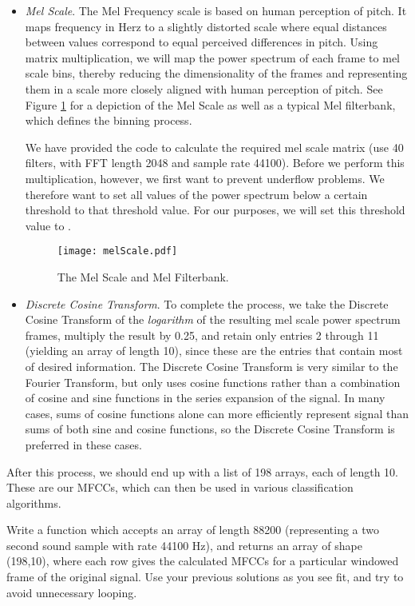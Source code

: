 \begin{itemize}
\item \emph{Mel Scale}. The Mel Frequency scale is based on human perception of pitch. It maps frequency
in Herz to a slightly distorted scale where equal distances between values correspond to equal perceived
differences in pitch. Using matrix multiplication, we will map the power spectrum of each frame to
mel scale bins, thereby reducing the dimensionality of the frames and representing them in a scale
more closely aligned with human perception of pitch. See Figure \ref{fourierext:mel} for a depiction
of the Mel Scale as well as a typical Mel filterbank, which defines the binning process.

We have provided the code to calculate the required mel scale
matrix (use 40 filters, with FFT length 2048 and sample rate 44100).
Before we perform this multiplication, however, we first want to prevent underflow problems. We
therefore want to set all values of the power spectrum below a certain threshold to that threshold value.
For our purposes, we will set this threshold value to .

\begin{figure}
\centering
\texttt{[image: melScale.pdf]}
\caption{The Mel Scale and Mel Filterbank.}
\label{fourierext:mel}
\end{figure}

\item \emph{Discrete Cosine Transform}. To complete the process, we take the Discrete Cosine Transform
of the \emph{logarithm} of the resulting mel scale power spectrum frames, multiply the result by 0.25, and retain only entries 2
through 11 (yielding an array of length 10), since these are the entries that contain most of desired
information. The Discrete Cosine Transform is very similar to the Fourier Transform, but only uses
cosine functions rather than a combination of cosine and sine functions in the series expansion of the
signal. In many cases, sums of cosine functions alone can more efficiently represent signal than
sums of both sine and cosine functions, so the Discrete Cosine Transform is preferred in these cases.
\end{itemize}
After this process, we should end up with a list of 198 arrays, each of length 10. These are our MFCCs,
which can then be used in various classification algorithms.

\begin{problem}
Write a function  which accepts an array of length 88200 (representing a two second sound sample
with rate 44100 Hz), and returns an array of shape (198,10), where each row gives the calculated MFCCs for
a particular windowed frame of the original signal. Use your previous solutions as you see fit, and try to
avoid unnecessary looping.
\end{problem}

